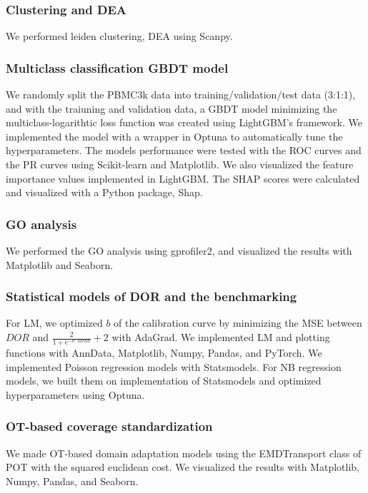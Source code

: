 \documentclass{article}
\begin{document}
\subsubsection*{Clustering and DEA}
We performed leiden clustering, DEA using Scanpy.

\subsubsection*{Multiclass classification GBDT model}
We randomly split the PBMC3k data into training/validation/test data (3:1:1), and with the traiuning and validation 
data, a GBDT model minimizing the multiclass-logarithtic loss function was created using LightGBM's 
framework. We implemented the model with a wrapper in Optuna to automatically tune the hyperparameters. The 
models performance were tested with the ROC curves and the PR curves using Scikit-learn and Matplotlib. We 
also visualized the feature importance values implemented in LightGBM. The SHAP scores were calculated and visualized 
with a Python package, Shap\cite{shap,shap_treeexplainer}.

\subsubsection*{GO analysis}
We performed the GO analysis using gprofiler2\cite{gprofiler2}, and visualized the results with Matplotlib and Seaborn.

\subsubsection*{Statistical models of DOR and the benchmarking}
For LM, we optimized $b$ of the calibration curve by minimizing the MSE between $DOR$ and $\frac{2}{1+e^{-b\cdot Mean}}+2$ with 
AdaGrad. We implemented LM and plotting functions with AnnData, Matplotlib, Numpy, Pandas, and PyTorch\cite{pytorch}. 
We implemented Poisson regression models with Statsmodels\cite{statsmodels}. For NB regression models, we built them on 
implementation of Statsmodels and optimized hyperparameters using Optuna\cite{optuna}.

\subsubsection*{OT-based coverage standardization}
We made OT-based domain adaptation models using the EMDTransport class of POT\cite{pot} with the squared euclidean 
cost. We visualized the results with Matplotlib, Numpy, Pandas, and Seaborn.
\end{document}
